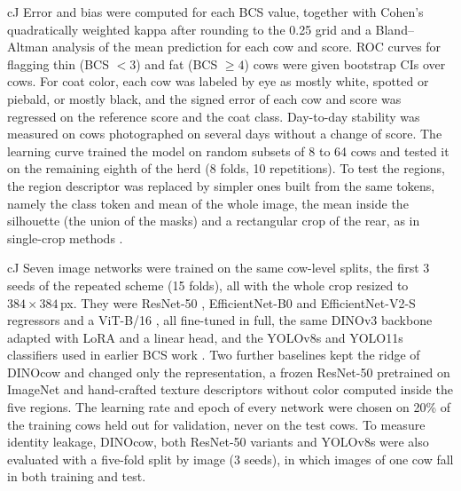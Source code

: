 \begin{marca}{cJ}
Error and bias were computed for each BCS value, together with Cohen's quadratically weighted kappa after rounding to the 0.25 grid and a Bland--Altman analysis \citep{bland1986} of the mean prediction for each cow and score.
ROC curves for flagging thin (BCS $<3$) and fat (BCS $\geq4$) cows were given bootstrap CIs over cows.
For coat color, each cow was labeled by eye as mostly white, spotted or piebald, or mostly black, and the signed error of each cow and score was regressed on the reference score and the coat class.
Day-to-day stability was measured on cows photographed on several days without a change of score.
The learning curve trained the model on random subsets of 8 to 64 cows and tested it on the remaining eighth of the herd (8 folds, 10 repetitions).
To test the regions, the region descriptor was replaced by simpler ones built from the same tokens, namely the class token and mean of the whole image, the mean inside the silhouette (the union of the masks) and a rectangular crop of the rear, as in single-crop methods \citep{nagy2023}.
\end{marca}

\begin{marca}{cJ}
Seven image networks were trained on the same cow-level splits, the first 3 seeds of the repeated scheme (15 folds), all with the whole crop resized to $384\times384$\,px.
They were ResNet-50 \citep{he2016resnet}, EfficientNet-B0 \citep{tan2019efficientnet} and EfficientNet-V2-S \citep{tan2021efficientnetv2} regressors and a ViT-B/16 \citep{touvron2021deit}, all fine-tuned in full, the same DINOv3 backbone adapted with LoRA \citep{hu2022lora} and a linear head, and the YOLOv8s and YOLO11s classifiers \citep{jocher2023yolov8,jocher2024yolo11} used in earlier BCS work \citep{dandil2024,zheng2024}.
Two further baselines kept the ridge of DINOcow and changed only the representation, a frozen ResNet-50 pretrained on ImageNet and hand-crafted texture descriptors without color computed inside the five regions.
The learning rate and epoch of every network were chosen on 20\% of the training cows held out for validation, never on the test cows.
To measure identity leakage, DINOcow, both ResNet-50 variants and YOLOv8s were also evaluated with a five-fold split by image (3 seeds), in which images of one cow fall in both training and test.
\end{marca}
